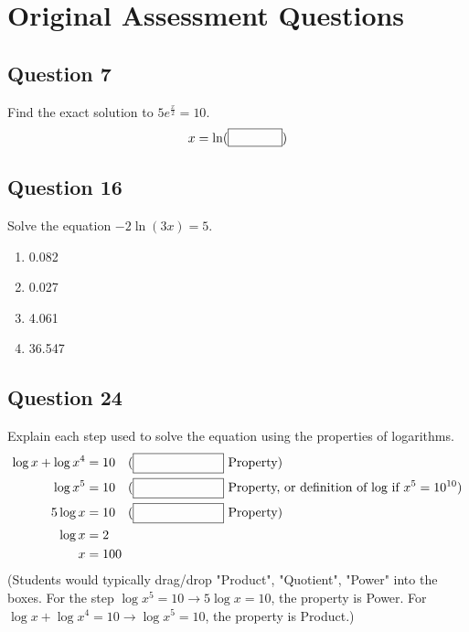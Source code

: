 \documentclass[12pt]{article}
\begin{document}
\section*{Original Assessment Questions}

\subsection*{Question 7}
Find the exact solution to \( 5e^{\frac{x}{2}} = 10 \).
\[ x = \ln ( \framebox[1.5cm]{\phantom{X}} ) \]

\subsection*{Question 16}
Solve the equation \( -2 \ln(3x) = 5 \).
\begin{enumerate}[label=\Alph*.]
    \item 0.082
    \item 0.027
    \item 4.061
    \item 36.547
\end{enumerate}

\subsection*{Question 24}
Explain each step used to solve the equation using the properties of logarithms.
\begin{align*}
    \log x + \log x^4 &= 10 \quad \text{(\framebox[2.5cm]{\phantom{Property}} Property)} \\
    \log x^5 &= 10 \quad \text{(\framebox[2.5cm]{\phantom{Property}} Property, or definition of log if } x^5=10^{10}) \\
    5 \log x &= 10 \quad \text{(\framebox[2.5cm]{\phantom{Property}} Property)} \\
    \log x &= 2 \\
    x &= 100
\end{align*}
(Students would typically drag/drop "Product", "Quotient", "Power" into the boxes. For the step \(\log x^5 = 10 \to 5 \log x = 10\), the property is Power. For \(\log x + \log x^4 = 10 \to \log x^5 = 10\), the property is Product.)
\end{document}
